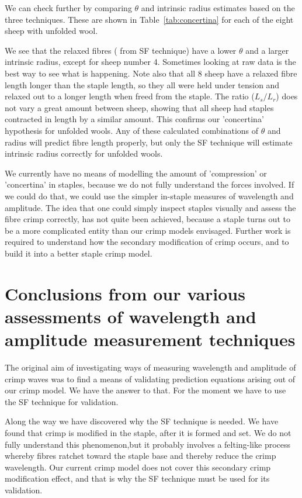\documentclass[titlepage,10pt]{article}  %
\begin{document}
We can check further by comparing $\theta$ and intrinsic radius estimates based on the three techniques. These are shown in Table~\ref{tab:concertina} for each of the eight sheep with unfolded wool. 

We see that the relaxed fibres ( from SF technique) have a lower $\theta$ and a larger intrinsic radius, except for sheep number 4. Sometimes looking at raw data is the best way to see what is happening. Note also that all 8 sheep have a relaxed fibre length longer than the staple length, so they all were held under tension and relaxed out to a longer length when freed from the staple. The ratio ($L_{s}/L_{r}$) does not vary a great amount between sheep, showing that all sheep had staples contracted in length by a similar amount.  This confirms our 'concertina' hypothesis for unfolded wools. Any of these calculated combinations of $\theta$ and radius will predict fibre length properly, but only the SF technique will estimate intrinsic radius correctly for unfolded wools.

We currently have no means of modelling the amount of 'compression'  or 'concertina' in staples, because we do not fully understand the forces involved. If we could do that, we could use the simpler in-staple measures of wavelength and amplitude. The idea that one could simply inspect staples visually and assess the fibre crimp correctly, has not quite been achieved, because a staple turns out to be a more complicated entity than our crimp models envisaged. Further work is required to understand how the secondary modification of crimp occurs, and to build it into a better staple crimp model.


\section{Conclusions from our various assessments of wavelength and amplitude measurement techniques}
 The original aim of investigating ways of measuring wavelength and amplitude of crimp waves was to find a means of validating prediction equations arising out of our crimp model. We have the answer to that. For the moment we have to use the SF technique for validation.

Along the way we have discovered why the SF technique is needed.  We have found that crimp is modified in the staple, after it is formed and set. We do not fully understand this phenomenon,but it probably involves a felting-like process whereby fibres ratchet toward the staple base and thereby reduce the crimp wavelength. Our current crimp model does not cover this secondary crimp modification effect, and that is why the SF technique must be used for its validation.
\end{document}
